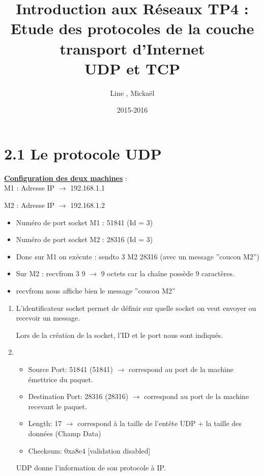 \documentclass{article}
\title{Introduction aux Réseaux TP4 : \\ Etude des protocoles de la couche transport d'Internet\\UDP et TCP}
\author{Line \bsc{POUVARET}, Mickaël \bsc{TURNEL}}
\date{2015-2016}
\begin{document}
\maketitle

\section*{2.1 Le protocole UDP}

\textbf{\underline{Configuration des deux machines}} :\\

M1 : Adresse IP $\rightarrow$ 192.168.1.1

M2 : Adresse IP $\rightarrow$ 192.168.1.2

\begin{itemize}
	\item Numéro de port socket M1 : 51841 (Id = 3)
	\item Numéro de port socket M2 : 28316 (Id = 3)
	\item Donc sur M1 on exécute : sendto 3 M2 28316 (avec un message ''coucou M2'')
	\item Sur M2 : recvfrom 3 9 $\rightarrow$ 9 octets car la chaîne possède 9 caractères.
	\item recvfrom nous affiche bien le message ''coucou M2''
\end{itemize}

\begin{enumerate}
	\item L'identificateur socket permet de définir sur quelle socket on veut envoyer ou recevoir un message.
	
Lors de la création de la socket, l'ID et le port nous sont indiqués.

	\item \begin{itemize}
		\item Source Port: 51841 (51841) $\rightarrow$ correspond au port de la machine émettrice du paquet.
		\item Destination Port: 28316 (28316) $\rightarrow$ correspond au port de la machine recevant le paquet.
		\item Length: 17 $\rightarrow$ correspond à la taille de l'entête UDP + la taille des données (Champ Data)
		\item Checksum: 0xa8c4 [validation disabled] 
		\end{itemize}

UDP donne l'information de son protocole à IP.
\end{enumerate}
\end{document}
